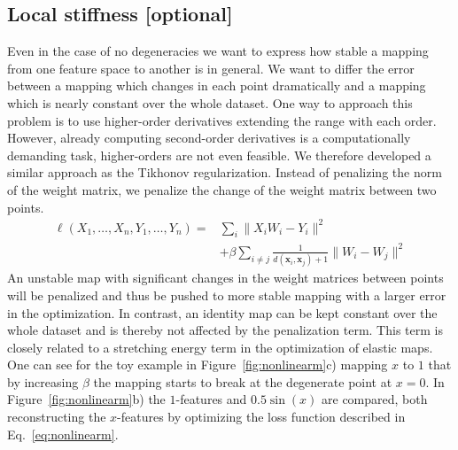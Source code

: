 \subsection{Local stiffness [optional]}
Even in the case of no degeneracies we want to express how stable a mapping from one feature space to another is in general.
We want to differ the error between a mapping which changes in each point dramatically and a mapping which is nearly constant over the whole dataset.
One way to approach this problem is to use higher-order derivatives extending the range with each order.
However, already computing second-order derivatives is a computationally demanding task, higher-orders are not even feasible.
We therefore developed a similar approach as the Tikhonov regularization.
Instead of penalizing the norm of the weight matrix, we penalize the change of the weight matrix between two points.
\begin{align}
\ell(X_1, \ldots, X_n, Y_1, \ldots, Y_n) =& \sum_i
\|X_iW_i-Y_i\|^2 \nonumber \\
&+ \beta\sum_{i\neq j}\frac{1}{d(\mathbf{x}_i,\mathbf{x}_j)+1}\|W_i-W_j\|^2\label{eq:nonlinearm}
\end{align}
An unstable map with significant changes in the weight matrices between points will be penalized and thus be pushed to more stable mapping with a larger error in the optimization.
In contrast, an identity map can be kept constant over the whole dataset and is thereby not affected by the penalization term.
This term is closely related to a stretching energy term in the optimization of elastic maps\cite{kass1988snakes}.
One can see for the toy example in Figure~\ref{fig:nonlinearm}c) mapping $x$ to $1$ that by increasing $\beta$ the mapping starts to break at the degenerate point at $x=0$.
In Figure~\ref{fig:nonlinearm}b) the $1$-features and $0.5\sin(x)$ are compared, both reconstructing the $x$-features by optimizing the loss function described in Eq.~\ref{eq:nonlinearm}.
